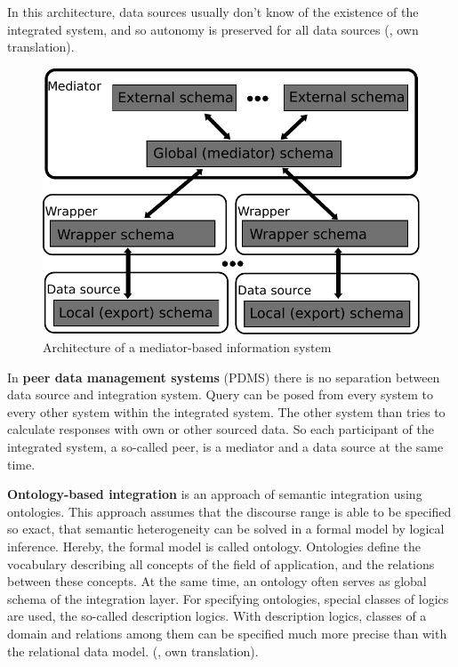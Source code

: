 In this architecture, data sources usually don't know of the existence of the integrated system, and so autonomy is preserved for all data sources (\cite[p. 97]{DBLP:books/dp/LeserN2006}, own translation).
\begin{figure}[H]
	\begin{center}
		\includegraphics[scale=0.5]{figures/MediatorBasedArchitecture.pdf}
	\end{center}
	\caption{Architecture of a  mediator-based information system}
	\label{MediatorBasedArchitecture}
\end{figure}
In \textbf{peer data management systems} (PDMS) there is no separation between data source and integration system. Query can be posed from every system to every other system within the integrated system. The other system than tries to calculate responses with own or other sourced data. So each participant of the integrated system, a so-called peer, is a mediator and a data source at the same time.  

\textbf{Ontology-based integration} is an approach of semantic integration using ontologies. This approach assumes that the discourse range is able to be specified so exact, that semantic heterogeneity can be solved in a formal model by logical inference. Hereby, the formal model is called ontology. Ontologies define the vocabulary describing all concepts of the field of application, and the relations between these concepts. At the same time, an ontology often serves as global schema of the integration layer. For specifying ontologies, special classes of logics are used, the so-called description logics. With description logics, classes of a domain and relations among them can be specified much more precise than with the relational data model. (\cite[p. 267]{DBLP:books/dp/LeserN2006}, own translation).\\